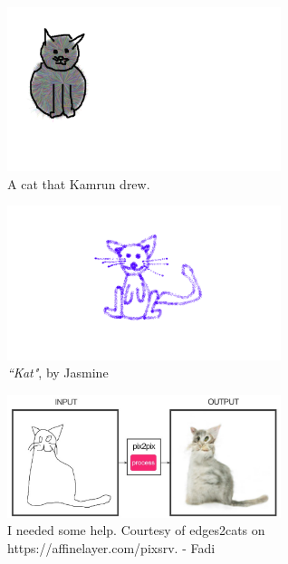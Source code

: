 \begin{centering}
\begin{figure}
	\includegraphics[width=8cm]{cat742afer228.pdf}
  \caption{A cat that Kamrun drew.}
  \label{Cat draw by Kamrun}
\end{figure}




\begin{figure} \centering
    \includegraphics[width=8cm]{kat.pdf}
    \caption{\emph{``Kat"}, by Jasmine}
    \label{kat}
\end{figure}


\begin{figure}\centering
  \includegraphics[width=8cm]{cat-fadiwassaf.pdf}
  \caption{I needed some help. Courtesy of edges2cats on https://affinelayer.com/pixsrv. - Fadi}
  \label{cat-fadi}
\end{figure}
\end{centering}


\clearpage
